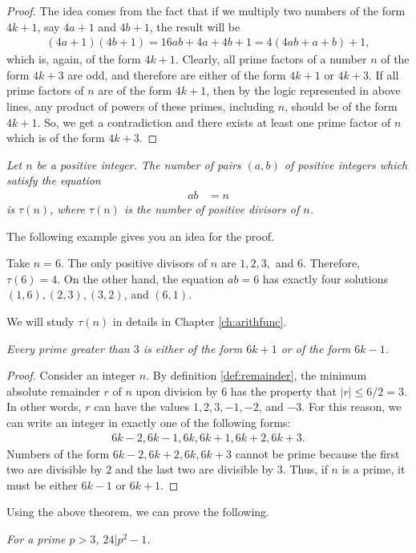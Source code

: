 \documentclass{subfile}
\begin{document}
	\begin{proof}
		The idea comes from the fact that if we multiply two numbers of the form $4k+1$, say $4a+1$ and $4b+1$, the result will be
		\begin{align*}
			(4a+1)(4b+1)=16ab+4a+4b+1=4(4ab+a+b)+1,
		\end{align*}
		which is, again, of the form $4k+1$. Clearly, all prime factors of a number $n$ of the form $4k+3$ are odd, and therefore are either of the form $4k+1$ or $4k+3$. If all prime factors of $n$ are of the form $4k+1$, then by the logic represented in above lines, any product of powers of these primes, including $n$, should be of the form $4k+1$. So, we get a contradiction and there exists at least one prime factor of $n$ which is of the form $4k+3$.
	\end{proof}
	\begin{theorem}\slshape\label{thm:nos}
		Let $n$ be a positive integer. The number of pairs $(a,b)$ of positive integers which satisfy the equation
		\begin{align*}
			ab & = n
		\end{align*}
		is $\tau(n)$, where $\tau(n)$ is the number of positive divisors of $n$.
	\end{theorem}

	The following example gives you an idea for the proof.

	\begin{example}
		Take $n=6$. The only positive divisors of $n$ are $1,2,3,$ and $6$. Therefore, $\tau(6)=4$. On the other hand, the equation $ab=6$ has exactly four solutions $(1,6), (2,3),(3,2)$, and $(6,1)$.
	\end{example}

	We will study $\tau(n)$ in details in Chapter \ref{ch:arithfunc}.

	\begin{theorem}\slshape
		Every prime greater than $3$ is either of the form $6k+1$ or of the form $6k-1$.
	\end{theorem}

	\begin{proof}
		Consider an integer $n$. By definition \eqref{def:remainder}, the minimum absolute remainder $r$ of $n$ upon division by $6$ has the property that $|r| \leq 6/2=3$. In other words, $r$ can have the values $1,2,3,-1,-2$, and $-3$. For this reason, we can write an integer in exactly one of the following forms:
		\begin{align*}
			6k-2,6k-1,6k,6k+1,6k+2,6k+3.
		\end{align*}
		Numbers of the form $6k-2, 6k+2, 6k, 6k+3$ cannot be prime because the first two are divisible by $2$ and the last two are divisible by $3$. Thus, if $n$ is a prime, it must be either $6k-1$ or $6k+1$.
	\end{proof}
	Using the above theorem, we can prove the following.
	\begin{theorem}\slshape
		For a prime $p>3$, $24|p^2-1$.
	\end{theorem}
\end{document}
